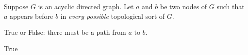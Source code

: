 \begin{prob}
    Suppose $G$ is an acyclic directed graph. Let $a$ and $b$ be two nodes of
    $G$ such that $a$ appears before $b$ in \emph{every possible} topological
    sort of $G$.

    True or False: there must be a path from $a$ to $b$.

    \Tf{}

    \begin{soln}
        True
    \end{soln}
\end{prob}

